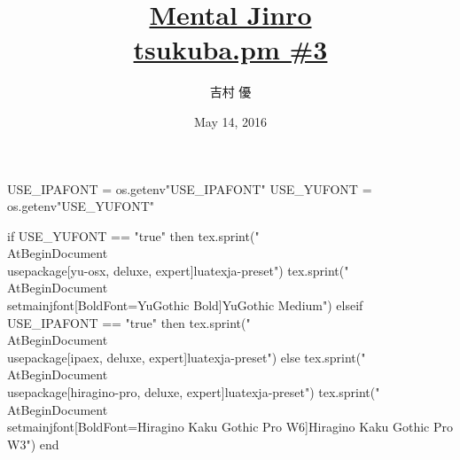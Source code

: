 \hypersetup{colorlinks,linkcolor=,urlcolor=links}

\beamertemplatenavigationsymbolsempty

\usepackage{luacode}
\usepackage{luatexja}
\usepackage{pgfpages}
\usepackage[osf]{mathpazo}

\begin{luacode*}
  USE_IPAFONT = os.getenv"USE_IPAFONT"
  USE_YUFONT = os.getenv"USE_YUFONT"
  
  if USE_YUFONT == "true" then
    tex.sprint("\\AtBeginDocument{\\usepackage[yu-osx, deluxe, expert]{luatexja-preset}}")
    tex.sprint("\\AtBeginDocument{\\setmainjfont[BoldFont=YuGothic Bold]{YuGothic Medium}}")
  elseif USE_IPAFONT == "true" then
    tex.sprint("\\AtBeginDocument{\\usepackage[ipaex, deluxe, expert]{luatexja-preset}}")
  else
    tex.sprint("\\AtBeginDocument{\\usepackage[hiragino-pro, deluxe, expert]{luatexja-preset}}")
    tex.sprint("\\AtBeginDocument{\\setmainjfont[BoldFont=Hiragino Kaku Gothic Pro W6]{Hiragino Kaku Gothic Pro W3}}")
  end
\end{luacode*}

\usepackage{epigraph}
\usepackage{etoolbox}
\usepackage{tikz}
\usepackage{framed}
\usepackage{libertine}
\usepackage[final]{listings}
\usepackage{amsmath}
\usepackage{mathtools}



\setmainfont[Numbers=OldStyle, BoldFont=Palatino Bold]{Palatino}
\setsansfont{CMU Sans Serif}
\setmonofont{CMU Typewriter Text}

\title[Mental Jinro]{%
  \href{https://github.com/y-yu/mental-jinro-slide}{Mental Jinro} \\
  \href{http://connpass.com/event/30661/}{\normalsize tsukuba.pm \#3}
}
\author{吉村 優}
\date{May 14, 2016}

